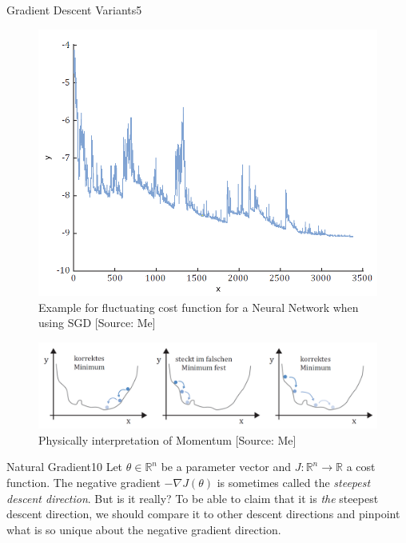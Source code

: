 \begin{questions}
\begin{question}{Gradient Descent Variants}{5}
\begin{figure}[h!]
	\includegraphics[width=12cm, scale=0.5]{SGD.png}
	\caption{Example for fluctuating cost function for a Neural Network when using SGD [Source: Me]}
	\label{fig:SGD_cost_function}
\end{figure}
\begin{figure}[h!]
	\includegraphics[width=\linewidth, scale=0.5]{momentum.png}
	\caption{Physically interpretation of Momentum [Source: Me]}
	\label{fig:Momentum}
\end{figure}


\end{question}

\begin{question}[bonus]{Natural Gradient}{10}
Let $\theta \in \mathbb{R}^n$ be a parameter vector
and $J \colon \mathbb{R}^n \to \mathbb{R}$ a cost function.
The negative gradient $-\nabla J(\theta)$ is sometimes called
the \emph{steepest descent direction}. But is it really?
To be able to claim that it is \emph{the} steepest descent direction,
we should compare it to other descent directions
and pinpoint what is so unique about the negative gradient direction.


\end{question}
\end{questions}
